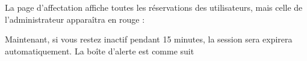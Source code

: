 \documentclass{article}
\begin{document}
\begin{enumerate}
  \vspace{0.7cm}
               \hspace*{-0.7in}

               \noindent{}
  
  
  La page d'affectation affiche toutes les réservations des utilisateurs, mais celle de l'administrateur apparaîtra en rouge :
  
  \vspace{0.7cm}
               \hspace*{-0.7in}
               \noindent{}
               
               
    \vspace{4cm}           
               Maintenant, si vous restez inactif pendant 15 minutes, la session sera expirera automatiquement. La boîte d'alerte est comme suit
  

\end{enumerate}
\end{document}

